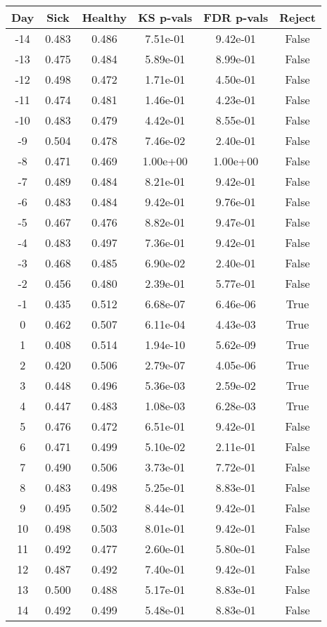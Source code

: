 \begin{tabular}{c|c|c|c|c|c}
Day &  Sick & Healthy &  KS p-vals & FDR p-vals & Reject\\
\hline
-14 & 0.483 &   0.486 &   7.51e-01 &   9.42e-01 &  False\\
-13 & 0.475 &   0.484 &   5.89e-01 &   8.99e-01 &  False\\
-12 & 0.498 &   0.472 &   1.71e-01 &   4.50e-01 &  False\\
-11 & 0.474 &   0.481 &   1.46e-01 &   4.23e-01 &  False\\
-10 & 0.483 &   0.479 &   4.42e-01 &   8.55e-01 &  False\\
 -9 & 0.504 &   0.478 &   7.46e-02 &   2.40e-01 &  False\\
 -8 & 0.471 &   0.469 &   1.00e+00 &   1.00e+00 &  False\\
 -7 & 0.489 &   0.484 &   8.21e-01 &   9.42e-01 &  False\\
 -6 & 0.483 &   0.484 &   9.42e-01 &   9.76e-01 &  False\\
 -5 & 0.467 &   0.476 &   8.82e-01 &   9.47e-01 &  False\\
 -4 & 0.483 &   0.497 &   7.36e-01 &   9.42e-01 &  False\\
 -3 & 0.468 &   0.485 &   6.90e-02 &   2.40e-01 &  False\\
 -2 & 0.456 &   0.480 &   2.39e-01 &   5.77e-01 &  False\\
 -1 & 0.435 &   0.512 &   6.68e-07 &   6.46e-06 &   True\\
  0 & 0.462 &   0.507 &   6.11e-04 &   4.43e-03 &   True\\
  1 & 0.408 &   0.514 &   1.94e-10 &   5.62e-09 &   True\\
  2 & 0.420 &   0.506 &   2.79e-07 &   4.05e-06 &   True\\
  3 & 0.448 &   0.496 &   5.36e-03 &   2.59e-02 &   True\\
  4 & 0.447 &   0.483 &   1.08e-03 &   6.28e-03 &   True\\
  5 & 0.476 &   0.472 &   6.51e-01 &   9.42e-01 &  False\\
  6 & 0.471 &   0.499 &   5.10e-02 &   2.11e-01 &  False\\
  7 & 0.490 &   0.506 &   3.73e-01 &   7.72e-01 &  False\\
  8 & 0.483 &   0.498 &   5.25e-01 &   8.83e-01 &  False\\
  9 & 0.495 &   0.502 &   8.44e-01 &   9.42e-01 &  False\\
 10 & 0.498 &   0.503 &   8.01e-01 &   9.42e-01 &  False\\
 11 & 0.492 &   0.477 &   2.60e-01 &   5.80e-01 &  False\\
 12 & 0.487 &   0.492 &   7.40e-01 &   9.42e-01 &  False\\
 13 & 0.500 &   0.488 &   5.17e-01 &   8.83e-01 &  False\\
 14 & 0.492 &   0.499 &   5.48e-01 &   8.83e-01 &  False\\
\end{tabular}